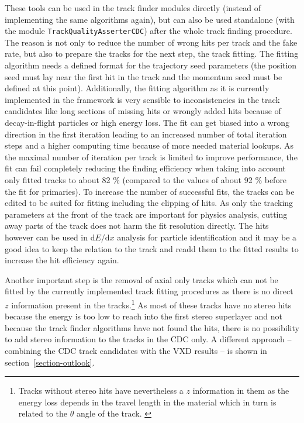 These tools can be used in the track finder modules directly (instead of implementing the same algorithms again), but can also be used standalone (with the module \texttt{TrackQualityAsserterCDC}) after the whole track finding procedure. The reason is not only to reduce the number of wrong hits per track and the fake rate, but also to prepare the tracks for the next step, the track fitting. The fitting algorithm needs a defined format for the trajectory seed parameters (the position seed must lay near the first hit in the track and the momentum seed must be defined at this point). Additionally, the fitting algorithm as it is currently implemented in the framework is very sensible to inconsistencies in the track candidates like long sections of missing hits or wrongly added hits because of decay-in-flight particles or high energy loss. The fit can get biased into a wrong direction in the first iteration leading to an increased number of total iteration steps and a higher computing time because of more needed material lookups. As the maximal number of iteration per track is limited to improve performance, the fit can fail completely reducing the finding efficiency when taking into account only fitted tracks to about 82 \% (compared to the values of about 92 \% before the fit for primaries). To increase the number of successful fits, the tracks can be edited to be suited for fitting including the clipping of hits. As only the tracking parameters at the front of the track are important for physics analysis, cutting away parts of the track does not harm the fit resolution directly. The hits however can be used in $\mathrm d E/\mathrm d x$ analysis for particle identification and it may be a good idea to keep the relation to the track and readd them to the fitted results to increase the hit efficiency again. 

Another important step is the removal of axial only tracks which can not be fitted by the currently implemented track fitting procedures as there is no direct $z$ information present in the tracks.\footnote{Tracks without stereo hits have nevertheless a $z$ information in them as the energy loss depends in the travel length in the material which in turn is related to the $\theta$ angle of the track. \cite{martin}} As most of these tracks have no stereo hits because the energy is too low to reach into the first stereo superlayer and not because the track finder algorithms have not found the hits, there is no possibility to add stereo information to the tracks in the CDC only. A different approach -- combining the CDC track candidates with the VXD results -- is shown in section~\ref{section-outlook}.

